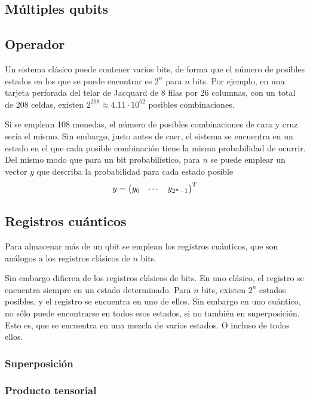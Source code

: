 \subsection{Múltiples qubits}

\subsection{Operador}

Un sistema clásico puede contener varios bits, de forma que el número de 
posibles estados en los que se puede encontrar es $2^n$ para $n$ bits. Por 
ejemplo, en una tarjeta perforada del telar de Jacquard de $8$ filas por 26 
columnas, con un total de 208 celdas, existen $2^{208} \approx 
4.11 \cdot 10^{62}$ posibles combinaciones.

Si se emplean 108 monedas, el número de posibles combinaciones de cara y cruz 
sería el mismo. Sin embargo, justo antes de caer, el sistema se encuentra en un 
estado en el que cada posible combinación tiene la misma probabilidad de 
ocurrir. Del mismo modo que para un bit probabilístico, para $n$ se puede 
emplear un vector $y$ que describa la probabilidad para cada estado posible
$$
	y = \begin{pmatrix} y_0 & \cdots & y_{2^n-1} \end{pmatrix}^T
$$

\subsection{Registros cuánticos}
Para almacenar más de un qbit se emplean los registros cuánticos, que son 
análogos a los registros clásicos de $n$ bits.

Sin embargo difieren de los registros clásicos de bits. En uno clásico, el 
registro se encuentra siempre en un estado determinado. Para $n$ bits, existen 
$2^n$ estados posibles, y el registro se encuentra en uno de ellos. Sin embargo 
en uno cuántico, no sólo puede encontrarse en todos esos estados, si no también 
en superposición. Esto es, que se encuentra en una mezcla de varios estados. O 
incluso de todos ellos.

\subsubsection{Superposición}


\subsubsection{Producto tensorial}
\label{sss:producto-tensorial}

